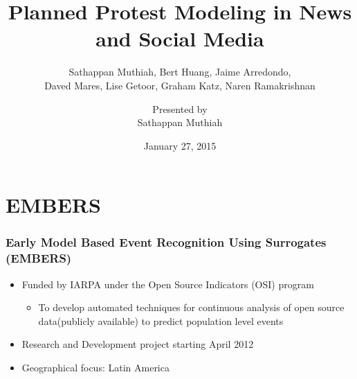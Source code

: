 \documentclass[red,handout]{beamer}
\begin{document}
\title[Planned Protest]{Planned Protest Modeling in News and Social Media}
\subtitle{\tiny Sathappan Muthiah, Bert Huang, Jaime Arredondo, \\
Daved Mares, Lise Getoor, Graham Katz, Naren Ramakrishnan}
\author[S.Muthiah]{Presented by \\
Sathappan Muthiah}


\date{January 27, 2015}
\frame{\titlepage}

\section{EMBERS}
\begin{frame}
    \frametitle{Early Model Based Event Recognition Using Surrogates (EMBERS)}
    \begin{itemize}[<+->]
        \item
            Funded by IARPA under the Open Source Indicators (OSI) program
            \begin{itemize}
                \item 
                    To develop automated techniques for continuous analysis of open source data(publicly available)
                    to predict population level events
            \end{itemize}
        \item
            Research and Development project starting April 2012

        \item
            Geographical focus: Latin America

    \end{itemize}
\end{frame}
\end{document}
